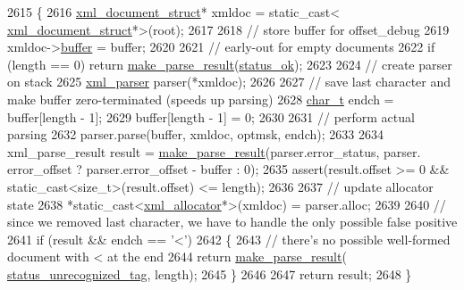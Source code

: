 \begin{DoxyCode}
2615         \{
2616             \hyperlink{structxml__document__struct}{xml\_document\_struct}* xmldoc = \textcolor{keyword}{static\_cast<}
      \hyperlink{structxml__document__struct}{xml\_document\_struct}*\textcolor{keyword}{>}(root);
2617 
2618             \textcolor{comment}{// store buffer for offset\_debug}
2619             xmldoc->\hyperlink{structxml__document__struct_a120451f29b8cc2a82a3ecc926449ea0e}{buffer} = buffer;
2620 
2621             \textcolor{comment}{// early-out for empty documents}
2622             \textcolor{keywordflow}{if} (length == 0) \textcolor{keywordflow}{return} \hyperlink{pugixml_8cpp_a9081c36df7470451a2a067677ee9e423}{make\_parse\_result}(\hyperlink{namespacepugi_a9054ca609e12afb8f3e5892fc6c0b555a46ddc2abb6a54fdac07cf9086b45f10f}{status\_ok});
2623 
2624             \textcolor{comment}{// create parser on stack}
2625             \hyperlink{structxml__parser}{xml\_parser} parser(*xmldoc);
2626 
2627             \textcolor{comment}{// save last character and make buffer zero-terminated (speeds up parsing)}
2628             \hyperlink{namespacepugi_aef5a7a62cba0507542220ea15afe39df}{char\_t} endch = buffer[length - 1];
2629             buffer[length - 1] = 0;
2630             
2631             \textcolor{comment}{// perform actual parsing}
2632             parser.parse(buffer, xmldoc, optmsk, endch);
2633 
2634             xml\_parse\_result result = \hyperlink{pugixml_8cpp_a9081c36df7470451a2a067677ee9e423}{make\_parse\_result}(parser.error\_status, parser.
      error\_offset ? parser.error\_offset - buffer : 0);
2635             assert(result.offset >= 0 && static\_cast<size\_t>(result.offset) <= length);
2636 
2637             \textcolor{comment}{// update allocator state}
2638             *\textcolor{keyword}{static\_cast<}\hyperlink{structxml__allocator}{xml\_allocator}*\textcolor{keyword}{>}(xmldoc) = parser.alloc;
2639 
2640             \textcolor{comment}{// since we removed last character, we have to handle the only possible false positive}
2641             if (result && endch == \textcolor{charliteral}{'<'})
2642             \{
2643                 \textcolor{comment}{// there's no possible well-formed document with < at the end}
2644                 \textcolor{keywordflow}{return} \hyperlink{pugixml_8cpp_a9081c36df7470451a2a067677ee9e423}{make\_parse\_result}(
      \hyperlink{namespacepugi_a9054ca609e12afb8f3e5892fc6c0b555a71a555b91e80b6d8f84aeb6a93904d28}{status\_unrecognized\_tag}, length);
2645             \}
2646 
2647             \textcolor{keywordflow}{return} result;
2648         \}
\end{DoxyCode}
